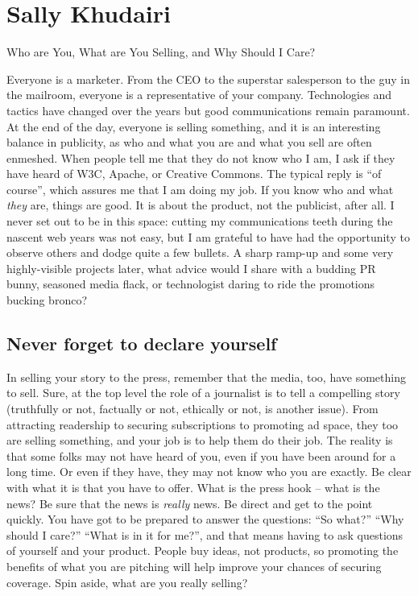 
\chapter{Sally Khudairi}{Who are You, What are You Selling, and Why Should I Care?}

Everyone is a marketer. From the CEO to the superstar salesperson to the guy in
the mailroom, everyone is a representative of your company. Technologies and
tactics have changed over the years but good communications remain paramount. At
the end of the day, everyone is selling something, and it is an interesting
balance in publicity, as who and what you are and what you sell are often
enmeshed. When people tell me that they do not know who I am, I ask if they have
heard of W3C, Apache, or Creative Commons. The typical reply is ``of course'',
which assures me that I am doing my job. If you know who and what \textit{they} are,
things are good. It is about the product, not the publicist, after all. I never
set out to be in this space: cutting my communications teeth during the nascent
web years was not easy, but I am grateful to have had the opportunity to observe
others and dodge quite a few bullets. A sharp ramp-up and some very
highly-visible projects later, what advice would I share with a budding PR bunny,
seasoned media flack, or technologist daring to ride the promotions bucking bronco?

\section*{Never forget to declare yourself}
In selling your story to the press, remember that the media, too, have something
to sell. Sure, at the top level the role of a journalist is to tell a compelling
story (truthfully or not, factually or not, ethically or not, is another issue).
From attracting readership to securing subscriptions to promoting ad space, they
too are selling something, and your job is to help them do their job. The
reality is that some folks may not have heard of you, even if you have been around
for a long time. Or even if they have, they may not know who you are exactly. Be
clear with what it is that you have to offer. What is the press hook -- what is
the news? Be sure that the news is \textit{really} news. Be direct and get to the point
quickly. You have got to be prepared to answer the questions: ``So what?'' ``Why
should I care?'' ``What is in it for me?'', and that means having to ask questions
of yourself and your product. People buy ideas, not products, so promoting the
benefits of what you are pitching will help improve your chances of securing coverage.
Spin aside, what are you really selling?

